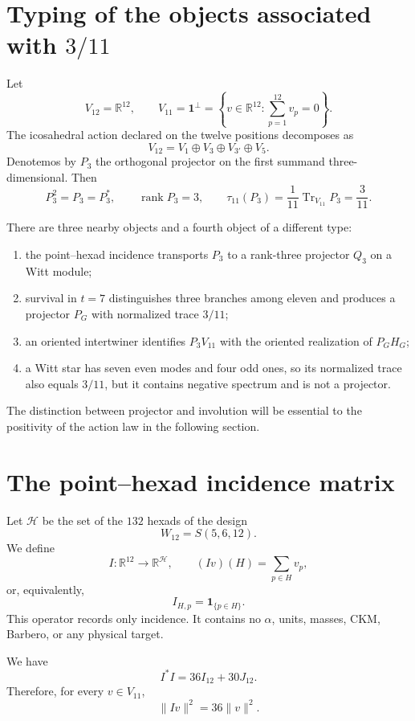 \section{Typing of the objects associated with \texorpdfstring{\(3/11\)}{3/11}}

Let
\[
 V_{12}=\mathbb R^{12},
 \qquad
 V_{11}=\mathbf 1^\perp
 =\left\{v\in\mathbb R^{12}:\sum_{p=1}^{12}v_p=0\right\}.
\]
The icosahedral action declared on the twelve positions decomposes as
\[
 V_{12}=V_1\oplus V_3\oplus V_{3'}\oplus V_5.
\]
Denotemos by \(P_3\) the orthogonal projector on the first summand
three-dimensional. Then
\[
 P_3^2=P_3=P_3^*,
 \qquad
 \operatorname{rank}P_3=3,
 \qquad
 \tau_{11}(P_3)
 =\frac1{11}\operatorname{Tr}_{V_{11}}P_3
 =\frac3{11}.
\]

There are three nearby objects and a fourth object of a different type:
\begin{enumerate}
  \item the point--hexad incidence transports \(P_3\) to a rank-three
  projector \(Q_3\) on a Witt module;
  \item survival in \(t=7\) distinguishes three branches among eleven and
  produces a projector \(P_G\) with normalized trace \(3/11\);
  \item an oriented intertwiner identifies
  \(P_3V_{11}\) with the oriented realization of \(P_GH_G\);
  \item a Witt star has seven even modes and four odd ones, so
  its normalized trace also equals \(3/11\), but it contains negative spectrum
  and is not a projector.
\end{enumerate}
The distinction between projector and involution will be essential to the positivity of the action law in the following section.

\section{The point--hexad incidence matrix}

Let \(\mathcal H\) be the set of the \(132\) hexads of the design
\[
 W_{12}=S(5,6,12).
\]
We define
\[
 I:\mathbb R^{12}\longrightarrow\mathbb R^{\mathcal H},
 \qquad
 (Iv)(H)=\sum_{p\in H}v_p,
\]
or, equivalently,
\[
 I_{H,p}=\mathbf 1_{\{p\in H\}}.
\]
This operator records only incidence. It contains no \(\alpha\), units,
masses, CKM, Barbero, or any physical target.

\begin{lemma}
\label{lem:incidencia-metrica-witt}
We have
\[
 \boxed{I^*I=36I_{12}+30J_{12}.}
\]
Therefore, for every \(v\in V_{11}\),
\[
 \|Iv\|^2=36\|v\|^2.
\]
\end{lemma}

